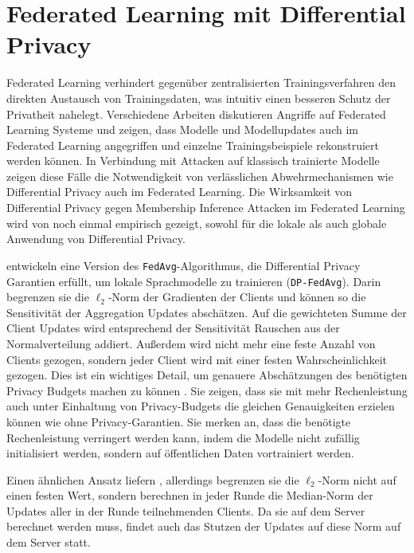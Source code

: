 \section{Federated Learning mit Differential Privacy}\label{sec:rw-fldp}
Federated Learning verhindert gegenüber zentralisierten Trainingsverfahren den direkten Austausch von Trainingsdaten, was intuitiv einen besseren Schutz der Privatheit nahelegt. Verschiedene Arbeiten \cite{wang:2019, geiping:2020, ma:2020} diskutieren Angriffe auf Federated Learning Systeme und zeigen, dass Modelle und Modellupdates auch im Federated Learning angegriffen und einzelne Trainingsbeispiele rekonstruiert werden können. In Verbindung mit Attacken auf klassisch trainierte Modelle zeigen diese Fälle die Notwendigkeit von verlässlichen Abwehrmechanismen wie Differential Privacy auch im Federated Learning. Die Wirksamkeit von Differential Privacy gegen Membership Inference Attacken im Federated Learning wird von \textcite{naseri:2022} noch einmal empirisch gezeigt, sowohl für die lokale als auch globale Anwendung von Differential Privacy.

\textcite{mcmahan:2018} entwickeln eine Version des \texttt{FedAvg}-Algorithmus, die Differential Privacy Garantien erfüllt, um lokale Sprachmodelle zu trainieren (\texttt{DP-FedAvg}). Darin begrenzen sie die $\ell_2$-Norm der Gradienten der Clients und können so die Sensitivität der Aggregation Updates abschätzen. Auf die gewichteten Summe der Client Updates wird entsprechend der Sensitivität Rauschen aus der Normalverteilung addiert. Außerdem wird nicht mehr eine feste Anzahl von Clients gezogen, sondern jeder Client wird mit einer festen Wahrscheinlichkeit gezogen. Dies ist ein wichtiges Detail, um genauere Abschätzungen des benötigten Privacy Budgets machen zu können \cite{wang:2020}. Sie zeigen, dass sie mit mehr Rechenleistung auch unter Einhaltung von Privacy-Budgets die gleichen Genauigkeiten erzielen können wie ohne Privacy-Garantien. Sie merken an, dass die benötigte Rechenleistung verringert werden kann, indem die Modelle nicht zufällig initialisiert werden, sondern auf öffentlichen Daten vortrainiert werden.

Einen ähnlichen Ansatz liefern \textcite{geyer:2017}, allerdings begrenzen sie die $\ell_2$-Norm nicht auf einen festen Wert, sondern berechnen in jeder Runde die Median-Norm der Updates aller in der Runde teilnehmenden Clients. Da sie auf dem Server berechnet werden muss, findet auch das Stutzen der Updates auf diese Norm auf dem Server statt. 

